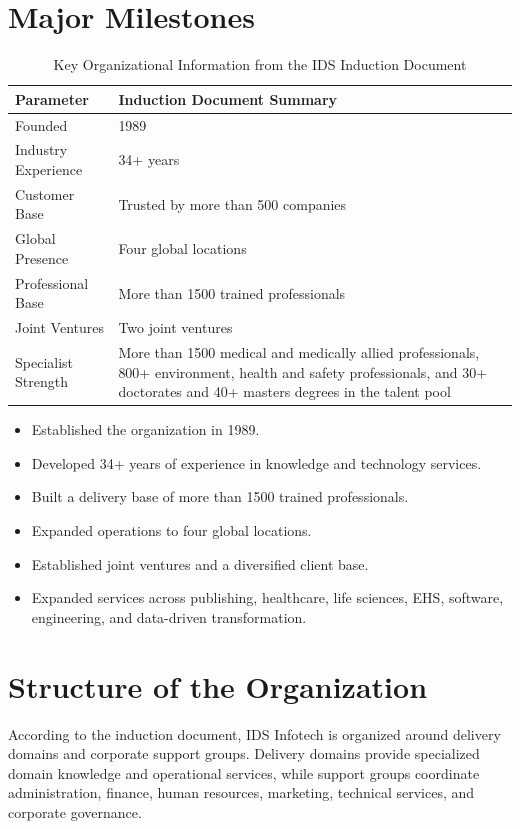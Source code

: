 \documentclass[12pt,a4paper]{report}
\begin{document}
\section{Major Milestones}
\label{sec:major-milestones}
\begin{table}[H]
\centering
\caption{Key Organizational Information from the IDS Induction Document}
\label{tab:ids-organizational-information}
\begin{tabularx}{\textwidth}{|>{\raggedright\arraybackslash}p{4.5cm}|X|}
\hline
\textbf{Parameter} & \textbf{Induction Document Summary} \\
\hline
Founded & 1989 \\
\hline
Industry Experience & 34+ years \\
\hline
Customer Base & Trusted by more than 500 companies \\
\hline
Global Presence & Four global locations \\
\hline
Professional Base & More than 1500 trained professionals \\
\hline
Joint Ventures & Two joint ventures \\
\hline
Specialist Strength & More than 1500 medical and medically allied professionals,
800+ environment, health and safety professionals, and 30+ doctorates and 40+ masters
degrees in the talent pool \\
\hline
\end{tabularx}
\end{table}

\begin{itemize}
    \item Established the organization in 1989.
    \item Developed 34+ years of experience in knowledge and technology services.
    \item Built a delivery base of more than 1500 trained professionals.
    \item Expanded operations to four global locations.
    \item Established joint ventures and a diversified client base.
    \item Expanded services across publishing, healthcare, life sciences, EHS, software,
    engineering, and data-driven transformation.
\end{itemize}

\section{Structure of the Organization}
\label{sec:organization-structure}
According to the induction document, IDS Infotech is organized around delivery domains and
corporate support groups. Delivery domains provide specialized domain knowledge and operational
services, while support groups coordinate administration, finance, human resources, marketing,
technical services, and corporate governance.
\end{document}
